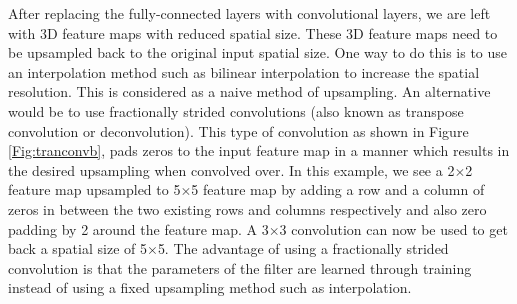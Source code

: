 After replacing the fully-connected layers with convolutional layers, we are left with 3D feature maps with reduced spatial size. These 3D feature maps need to be upsampled back to the original input spatial size. One way to do this is to use an interpolation method such as bilinear interpolation to increase the spatial resolution. This is considered as a naive method of upsampling. An alternative would be to use fractionally strided convolutions (also known as transpose convolution or deconvolution). This type of convolution as shown in Figure \ref{Fig:tranconvb}, pads zeros to the input feature map in a manner which results in the desired upsampling when convolved over. In this example, we see a 2$\times$2 feature map upsampled to 5$\times$5 feature map by adding a row and a column of zeros in between the two existing rows and columns respectively and also zero padding by 2 around the feature map. A 3$\times$3 convolution can now be used to get back a spatial size of 5$\times$5. The advantage of using a fractionally strided convolution is that the parameters of the filter are learned through training instead of using a fixed upsampling method such as interpolation.
